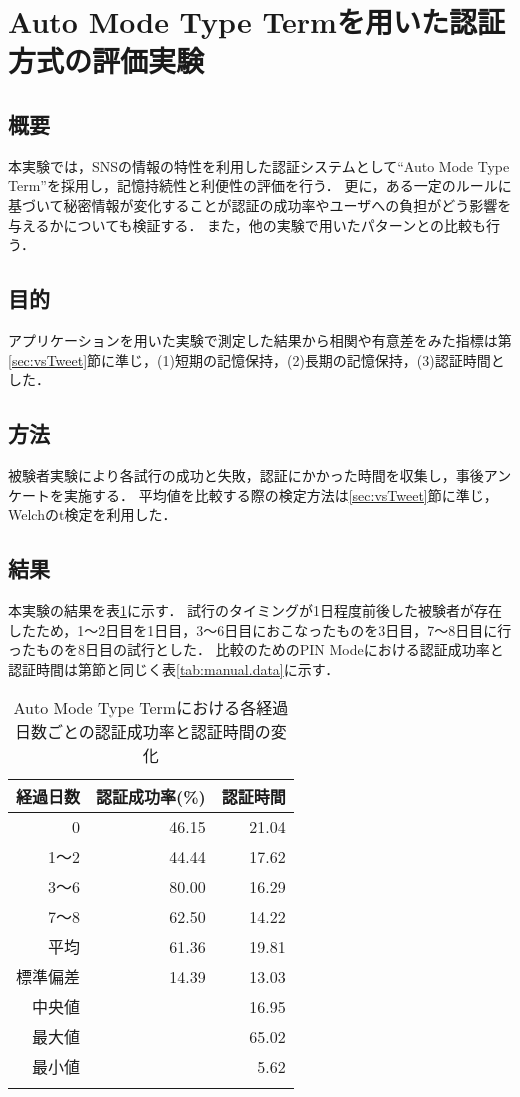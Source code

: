 \section{Auto Mode Type Termを用いた認証方式の評価実験}\label{sec:vsTerm}
\subsection{概要}
本実験では，SNSの情報の特性を利用した認証システムとして``Auto Mode Type Term''を採用し，記憶持続性と利便性の評価を行う．
更に，ある一定のルールに基づいて秘密情報が変化することが認証の成功率やユーザへの負担がどう影響を与えるかについても検証する．
また，他の実験で用いたパターンとの比較も行う．

\subsection{目的}
アプリケーションを用いた実験で測定した結果から相関や有意差をみた指標は第\ref{sec:vsTweet}節に準じ，(1)短期の記憶保持，(2)長期の記憶保持，(3)認証時間とした．

\subsection{方法}
被験者実験により各試行の成功と失敗，認証にかかった時間を収集し，事後アンケートを実施する．
平均値を比較する際の検定方法は\ref{sec:vsTweet}節に準じ，Welchのt検定を利用した．

\subsection{結果}
本実験の結果を表\ref{tab:auto_term.data}に示す．
試行のタイミングが1日程度前後した被験者が存在したため，1〜2日目を1日目，3〜6日目におこなったものを3日目，7〜8日目に行ったものを8日目の試行とした．
比較のためのPIN Modeにおける認証成功率と認証時間は第\label{sec:vsManual}節と同じく表\ref{tab:manual.data}に示す．
\begin{table}[ht]
  \caption{Auto Mode Type Termにおける各経過日数ごとの認証成功率と認証時間の変化}
  \label{tab:auto_term.data}
  \begin{center}
    \small
    \begin{tabular}{rrr}
      \bhline
      経過日数 & 認証成功率(\%) & 認証時間\\ \hline
      0 & 46.15 & 21.04 \\
      1〜2 & 44.44 & 17.62 \\
      3〜6 & 80.00 & 16.29 \\
      7〜8 & 62.50 & 14.22 \\ \hline \hline
      平均 & 61.36 & 19.81 \\
      標準偏差 & 14.39 & 13.03 \\
      中央値 & & 16.95 \\
      最大値 & & 65.02 \\
      最小値 & & 5.62 \\
      \bhline
    \end{tabular}
  \end{center}
\end{table}

